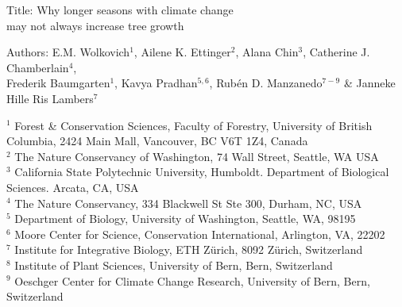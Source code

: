 \documentclass[11pt]{article}
\begin{document}
\renewcommand{\refname}{\CHead{}}

\begin{center}
{\sc Title:} {\Large Why longer seasons with climate change \\ may not always increase tree growth} \\
\vspace{5ex}

{\sc Authors:} E.M. Wolkovich$^1$, Ailene K. Ettinger$^2$, Alana Chin$^3$, Catherine J. Chamberlain$^4$,\\ Frederik Baumgarten$^1$, Kavya Pradhan$^{5,6}$, Rub{\'e}n D. Manzanedo$^{7-9}$ \&  Janneke Hille Ris Lambers$^7$
\end{center}

$^1$ Forest \& Conservation Sciences, Faculty of Forestry, University of British Columbia, 2424 Main Mall, Vancouver, BC V6T 1Z4, Canada\\
$^2$ The Nature Conservancy of Washington, 74 Wall Street, Seattle, WA  USA \\
$^3$ California State Polytechnic University, Humboldt. Department of Biological Sciences. Arcata, CA, USA \\
$^4$ The Nature Conservancy, 334 Blackwell St Ste 300, Durham, NC, USA \\ 
$^5$ Department of Biology, University of Washington, Seattle, WA, 98195 \\
$^6$ Moore Center for Science, Conservation International, Arlington, VA, 22202 \\ 
$^7$ Institute for Integrative Biology, ETH Z{\"u}rich, 8092 Z{\"u}rich, Switzerland \\
$^8$ Institute of Plant Sciences, University of Bern, Bern, Switzerland \\
$^9$ Oeschger Center for Climate Change Research, University of Bern, Bern, Switzerland \\


\newpage

\begin{abstract} 

Most climate change forecasts assume that longer growing seasons increase carbon storage through increased tree growth, but recent findings have challenged this assumption. Here we highlight divergent findings across studies, spanning diverse methods and disciplinary perspectives. Current hypotheses for why longer growing seasons may not always increase tree growth include drought-related effects and internal constraints. These hypotheses, however, are generally tested in different ways by different fields on different species, and rarely consider how external drivers and internal constraints interact. We outline how bridging these divides while integrating evolutionary history and ecological theory could help build a unified model across species for when longer seasons will---or will not---lead to greater tree growth, with major forecasting implications.

\end{abstract}
\end{document}
